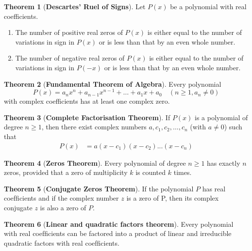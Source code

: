 \documentclass{article}
\theoremstyle{definition}
\newtheorem{theorem}{Theorem}[section]
\begin{document}
\begin{theorem}[\textbf{Descartes' Ruel of Signs}]
    Let $P(x)$ be a polynomial with real coefficients.
    \begin{enumerate}
        \item The number of positive real zeros of $P(x)$ is either equal to the number of variations in sign in $P(x)$ or is less than that by an even whole number.
        
        \item The number of negative real zeros of $P(x)$ is either equal to the number of variations in sign in $P(-x)$ or is less than that by an even whole number.
    \end{enumerate}
    \cite{stewart2015precalculus}
\end{theorem}

\begin{center}
    \begin{theorem}[\textbf{Fundamental Theorem of Algebra}]
        Every polynomial 
        \[
        P(x) = a_nx^n + a_{n-1}x^{n-1} + \ldots + a_1x + a_0 \quad (n\geq1, a_n\neq 0)
        \]
        with complex coefficients has at least one complex zero.
        \cite{stewart2015precalculus}
    \end{theorem}
\end{center}

\begin{center}
    \begin{theorem}[\textbf{Complete Factorisation Theorem}]
        If \(P(x)\) is a polynomial of degree \(n \geq 1\), then there exist complex numbers \(a, c_1, c_2, \ldots, c_n\) (with \(a \neq 0\)) such that
        \begin{align*}
            P(x) &= a(x-c_1)(x-c_2)...(x-c_n)
        \end{align*}
        \cite{stewart2015precalculus}
    \end{theorem}
\end{center}

\begin{theorem}[\textbf{Zeros Theorem}]
    Every polynomial of degree \(n \geq 1\) has exactly \(n\) zeros, provided that a zero of
    multiplicity \(k\) is counted \(k\) times.
    \cite{stewart2015precalculus}
\end{theorem}

\begin{theorem}[\textbf{Conjugate Zeros Theorem}]
    If the polynomial \(P\) has real coefﬁcients and if the complex number \(z\) is a zero
    of P, then its complex conjugate \(z\) is also a zero of \(P\).
    \cite{stewart2015precalculus}
\end{theorem}

\begin{theorem}[\textbf{Linear and quadratic factors theorem}]
    Every polynomial with real coefﬁcients can be factored into a product of linear
    and irreducible quadratic factors with real coefﬁcients.
    \cite{stewart2015precalculus}
\end{theorem}

\nocite{*}


\end{document}
